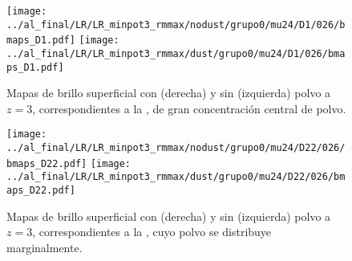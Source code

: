 

\begin{figure}[H]
 \centering
 \texttt{[image: ../al\_final/LR/LR\_minpot3\_rmmax/nodust/grupo0/mu24/D1/026/bmaps\_D1.pdf]}
 \texttt{[image: ../al\_final/LR/LR\_minpot3\_rmmax/dust/grupo0/mu24/D1/026/bmaps\_D1.pdf]}
\caption{Mapas de brillo superficial con (derecha) y sin (izquierda) polvo a $z=3$, correspondientes a la , de gran concentraci\'on central de polvo.}
\label{fig:polvo1}
\end{figure}


\begin{figure}[H]
 \centering
 \texttt{[image: ../al\_final/LR/LR\_minpot3\_rmmax/nodust/grupo0/mu24/D22/026/bmaps\_D22.pdf]}
 \texttt{[image: ../al\_final/LR/LR\_minpot3\_rmmax/dust/grupo0/mu24/D22/026/bmaps\_D22.pdf]}
\caption{Mapas de brillo superficial con (derecha) y sin (izquierda) polvo a $z=3$, correspondientes a la , cuyo polvo se distribuye marginalmente.}
\label{fig:polvo22}
\end{figure}

